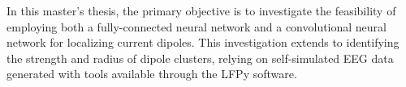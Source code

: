 \documentclass[a4paper, UKenglish, 11pt]{uiomaster}
\begin{document}
In this master's thesis, the primary objective is to investigate the feasibility of employing both a fully-connected neural network and a convolutional neural network for localizing current dipoles. This investigation extends to identifying the strength and radius of dipole clusters, relying on self-simulated EEG data generated with tools available through the LFPy software.


%
%
%
\end{document}
